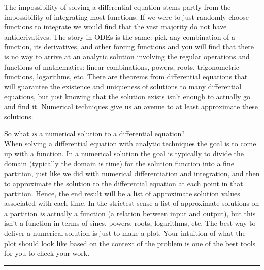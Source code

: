 \documentclass[
]{book}
\theoremstyle{definition}
\theoremstyle{definition}
\theoremstyle{definition}
\theoremstyle{remark}
\begin{document}
The impossibility of solving a differential equation stems partly from the impossibility of integrating most functions. If we were to just randomly choose functions to integrate we would find that the vast majority do not have antiderivatives. The story in ODEs is the same: pick any combination of a function, its derivatives, and other forcing functions and you will find that there is no way to arrive at an analytic solution involving the regular operations and functions of mathematics: linear combinations, powers, roots, trigonometric functions, logarithms, etc. There are theorems from differential equations that will guarantee the existence and uniqueness of solutions to many differential equations, but just knowing that the solution exists isn't enough to actually go and find it. Numerical techniques give us an avenue to at least approximate these solutions.

So what \emph{is} a numerical solution to a differential equation?\\
When solving a differential equation with analytic techniques the goal is to come up with a function. In a numerical solution the goal is typically to divide the domain (typically the domain is time) for the solution function into a fine partition, just like we did with numerical differentiation and integration, and then to approximate the solution to the differential equation at each point in that partition. Hence, the end result will be a list of approximate solution values associated with each time. In the strictest sense a list of approximate solutions on a partition \emph{is} actually a function (a relation between input and output), but this isn't a function in terms of sines, powers, roots, logarithms, etc. The best way to deliver a numerical solution is just to make a plot. Your intuition of what the plot should look like based on the context of the problem is one of the best tools for you to check your work.

\begin{center}\rule{0.5\linewidth}{0.5pt}\end{center}
\end{document}
